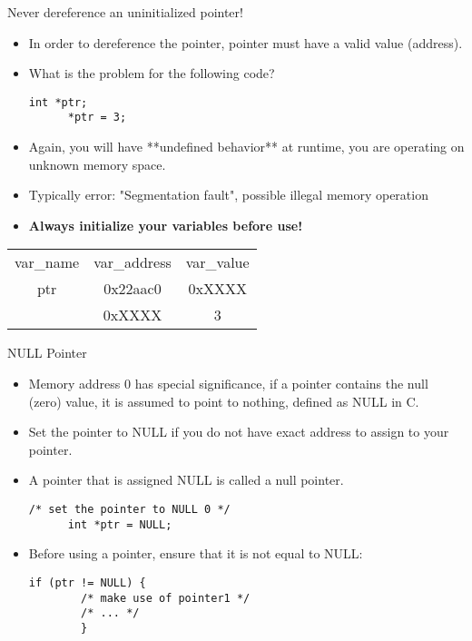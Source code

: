 \documentclass[10pt,t]{beamer}
\begin{document}
\begin{frame}[fragile]{Never dereference an uninitialized pointer!}
  \begin{itemize}
  \item In order to dereference the pointer, pointer must have a valid value (address).
  \item What is the problem for the following code?
    \begin{lstlisting}[basicstyle=\scriptsize\ttfamily]
      int *ptr;
      *ptr = 3; 
    \end{lstlisting}
  \item Again, you will have **undefined behavior** at runtime, you are operating on unknown memory space.
  \item Typically error: "Segmentation fault", possible illegal memory operation
  \item \textbf{Always initialize your variables before use!}
  \end{itemize}
  \begin{center}
    \begin{tabular}{c|c|c|}
      \cline{2-3}
      var\_name & var\_address & var\_value \\
      \cline{2-3}
      ptr & 0x22aac0 & 0xXXXX \\
      \cline{2-3}
      & 0xXXXX   & 3 \\
      \cline{2-3}
    \end{tabular}
  \end{center}
\end{frame}

\begin{frame}[fragile]{NULL Pointer}
  \begin{itemize}
  \item Memory address 0 has special significance, if a pointer contains the
    null (zero) value, it is assumed to point to nothing, defined as NULL
    in C.
  \item Set the pointer to NULL if you do not have exact address to assign
    to your pointer.
  \item A pointer that is assigned NULL is called a null pointer.
    \begin{lstlisting}[basicstyle=\scriptsize\ttfamily]
      /* set the pointer to NULL 0 */
      int *ptr = NULL;
    \end{lstlisting}
  \item Before using a pointer, ensure that it is not equal to NULL:
    \begin{lstlisting}[basicstyle=\scriptsize\ttfamily]
      if (ptr != NULL) {
        /* make use of pointer1 */
        /* ... */
        }
    \end{lstlisting}
  \end{itemize}
\end{frame}
\end{document}
